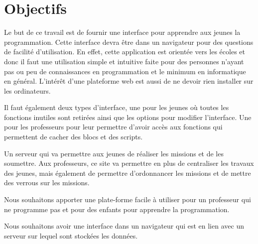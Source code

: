 \section{Objectifs}
\label{intro-objectifs}
Le but de ce travail est de fournir une interface pour apprendre aux jeunes la programmation. Cette interface devra être dans un navigateur pour des questions de facilité d'utilisation. En effet, cette application est orientée vers les écoles et donc il faut une utilisation simple et intuitive faite pour des personnes n'ayant pas ou peu de connaissances en programmation et le minimum en informatique en général. L'intérêt d'une plateforme web est aussi de ne devoir rien installer sur les ordinateurs.

Il faut également deux types d'interface, une pour les jeunes où toutes les fonctions inutiles sont retirées ainsi que les options pour modifier l'interface. Une pour les professeurs pour leur permettre d'avoir accès aux fonctions qui permettent de cacher des blocs et des scripts.

Un serveur qui va permettre aux jeunes de réaliser les missions et de les soumettre. Aux professeurs, ce site va permettre en plus de centraliser les travaux des jeunes, mais également de permettre d'ordonnancer les missions et de mettre des verrous sur les missions.

Nous souhaitons apporter une plate-forme facile à utiliser pour un professeur qui ne programme pas et pour des enfants pour apprendre la programmation. 

Nous souhaitons avoir une interface dans un navigateur qui est en lien avec un serveur sur lequel sont stockées les données.


